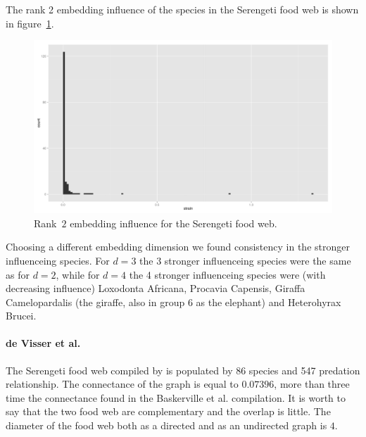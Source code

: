 \documentclass[12pt]{article}
\theoremstyle{definition}
\begin{document}
The rank 2 embedding influence of the species in the Serengeti food web is shown in figure~\ref{fig:SSB2}.

\begin{figure}[!ht]\label{fig:SSB2}
\centering
\includegraphics[height=0.3\textheight]{Images/influence_Serengeti_Baskerville_2.pdf}
\caption{Rank~$2$ embedding influence for the Serengeti food web.}
\end{figure}

Choosing a different embedding dimension we found consistency in the stronger influenceing species. For $d = 3$ the 3 stronger influenceing species were the same as for $d = 2$, while for $d = 4$ the 4 stronger influenceing species were (with decreasing influence) Loxodonta Africana, Procavia Capensis, Giraffa Camelopardalis (the giraffe, also in group $6$ as the elephant) and Heterohyrax Brucei.

\paragraph{de Visser et al.}
The Serengeti food web compiled by \cite{de2011serengeti} is populated by 86 species and 547 predation relationship. The connectance of the graph is equal to $0.07396$, more than three time the connectance found in the Baskerville et al. compilation. It is worth to say that the two food web are complementary and the overlap is little. The diameter of the food web both as a directed and as an undirected graph is $4$.
\end{document}
